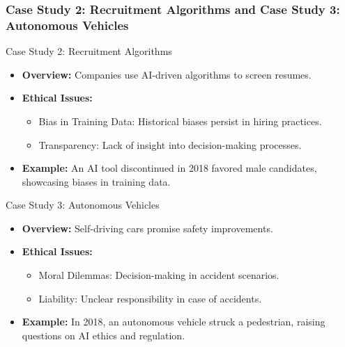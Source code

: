 \documentclass[aspectratio=169]{beamer}
\begin{document}
\begin{frame}[fragile]
    \frametitle{Case Study 2: Recruitment Algorithms and Case Study 3: Autonomous Vehicles}
    \begin{block}{Case Study 2: Recruitment Algorithms}
        \begin{itemize}
            \item \textbf{Overview:} 
            Companies use AI-driven algorithms to screen resumes.
            
            \item \textbf{Ethical Issues:}
            \begin{itemize}
                \item Bias in Training Data: Historical biases persist in hiring practices.
                \item Transparency: Lack of insight into decision-making processes.
            \end{itemize}
            
            \item \textbf{Example:} 
            An AI tool discontinued in 2018 favored male candidates, showcasing biases in training data.
        \end{itemize}
    \end{block}

    \begin{block}{Case Study 3: Autonomous Vehicles}
        \begin{itemize}
            \item \textbf{Overview:} 
            Self-driving cars promise safety improvements.
            
            \item \textbf{Ethical Issues:}
            \begin{itemize}
                \item Moral Dilemmas: Decision-making in accident scenarios.
                \item Liability: Unclear responsibility in case of accidents.
            \end{itemize}
            
            \item \textbf{Example:} 
            In 2018, an autonomous vehicle struck a pedestrian, raising questions on AI ethics and regulation.
        \end{itemize}
    \end{block}
\end{frame}
\end{document}
